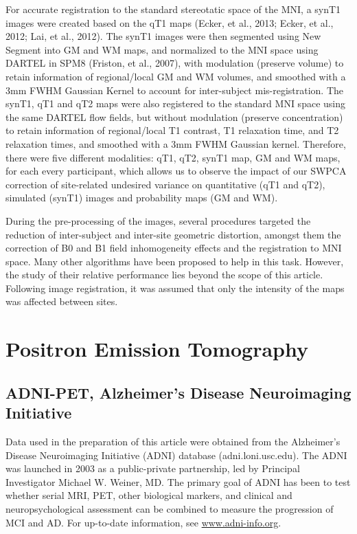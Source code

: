 For accurate registration to the standard stereotatic space of the
\ac{MNI}, a \ac{synT1} images were created based on the \ac{qT1}
maps (Ecker, et al., 2013; Ecker, et al., 2012; Lai, et al., 2012). The
\ac{synT1} images were then segmented using New Segment into \ac{GM} and
\ac{WM} maps, and normalized to the \ac{MNI} space using DARTEL in
SPM8 (Friston, et al., 2007), with modulation (preserve volume) to
retain information of regional/local \ac{GM} and \ac{WM} volumes, and smoothed
with a 3mm FWHM Gaussian Kernel to account for inter-subject
mis-registration. The \ac{synT1}, \ac{qT1} and \ac{qT2} maps were also registered to
the standard \ac{MNI} space using the same DARTEL flow fields, but without
modulation (preserve concentration) to retain information of
regional/local T1 contrast, T1 relaxation time, and T2 relaxation
times, and smoothed with a 3mm FWHM Gaussian kernel. Therefore, there
were five different modalities: \ac{qT1}, \ac{qT2}, \ac{synT1} map, \ac{GM} and \ac{WM} maps,
for each every participant, which allows us to observe the impact of our \ac{SWPCA} correction of site-related undesired variance on quantitative (\ac{qT1} and \ac{qT2}), simulated (\ac{synT1}) images and probability maps (\ac{GM} and \ac{WM}).
	
During the pre-processing of the images, several procedures targeted the reduction of inter-subject and inter-site geometric distortion, amongst them the correction of B0 and B1 field inhomogeneity effects and the registration to \ac{MNI} space. Many other algorithms have been proposed to help in this task. However, the study of their relative performance lies beyond the scope of this article. Following image registration, it was assumed that only the intensity of the maps was affected between sites.

\section{Positron Emission Tomography}
\subsection{ADNI-PET, Alzheimer's Disease Neuroimaging Initiative}\label{sec:adnipet}

Data used in the preparation of this article were obtained from the Alzheimer's Disease Neuroimaging Initiative (ADNI) database (adni.loni.usc.edu). The ADNI was launched in 2003 as a public-private partnership, led by Principal Investigator Michael W. Weiner, MD. The primary goal of ADNI has been to test whether serial MRI, PET, other biological markers, and clinical and neuropsychological assessment can be combined to measure the progression of MCI and AD. For up-to-date information, see \url{www.adni-info.org}.

